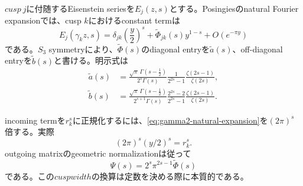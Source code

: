 \documentclass[11pt,a4paper]{ltjsarticle}
\theoremstyle{definition}
\theoremstyle{remark}
\begin{document}
$cusp\ j$に付随するEisenstein seriesを$E_j(z,s)$とする。Posingiesのnatural Fourier expansionでは、cusp $k$におけるconstant termは
\begin{equation}\label{eq:gamma2-natural-expansion}
 E_j(\gamma_k z,s)
 =\delta_{jk}\left(\frac{y}{2}\right)^s
 +\widetilde\Phi_{jk}(s)y^{1-s}
 +O(e^{-\pi y})
\end{equation}
である。$S_3$ symmetryにより、$\widetilde\Phi(s)$のdiagonal entryを$\widetilde a(s)$、off-diagonal entryを$\widetilde b(s)$と書ける。明示式は
\begin{align}
 \widetilde a(s)
 &=\frac{\sqrt\pi\,\Gamma(s-\frac12)}{2^s\Gamma(s)}
   \frac{1}{2^{2s}-1}
   \frac{\zeta(2s-1)}{\zeta(2s)},
 \label{eq:gamma2-a}\\
 \widetilde b(s)
 &=\frac{\sqrt\pi\,\Gamma(s-\frac12)}{2^{s+1}\Gamma(s)}
   \frac{2^{2s}-2}{2^{2s}-1}
   \frac{\zeta(2s-1)}{\zeta(2s)}.
 \label{eq:gamma2-b}
\end{align}

incoming termを$r_k^s$に正規化するには、\eqref{eq:gamma2-natural-expansion}を$(2\pi)^s$倍する。実際
\[
 (2\pi)^s(y/2)^s=r_k^s.
\]
outgoing matrixのgeometric normalizationは従って
\begin{equation}\label{eq:geometric-scattering-normalization}
 \Psi(s)=2^s\pi^{2s-1}\widetilde\Phi(s)
\end{equation}
である。この$cusp width$の換算は定数を決める際に本質的である。
\end{document}
